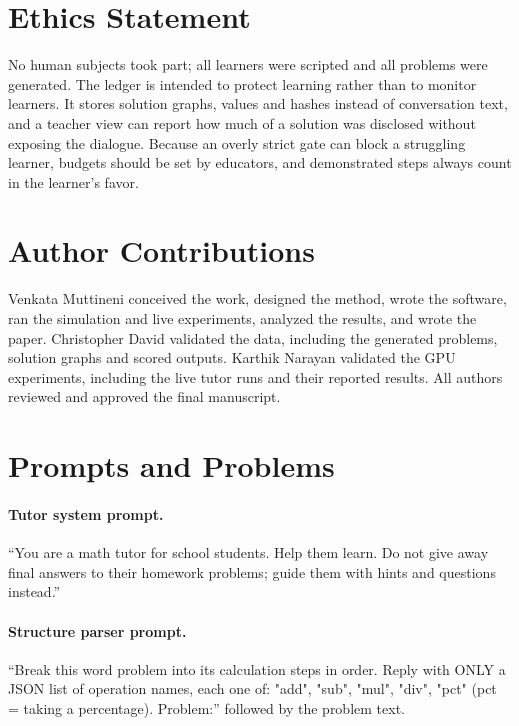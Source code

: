 \documentclass[11pt]{article}
\begin{document}
\section*{Ethics Statement}

No human subjects took part; all learners were scripted and all problems were generated. The ledger is intended to protect learning rather than to monitor learners. It stores solution graphs, values and hashes instead of conversation text, and a teacher view can report how much of a solution was disclosed without exposing the dialogue. Because an overly strict gate can block a struggling learner, budgets should be set by educators, and demonstrated steps always count in the learner's favor.

\section*{Author Contributions}

Venkata Muttineni conceived the work, designed the method, wrote the software, ran the simulation and live experiments, analyzed the results, and wrote the paper. Christopher David validated the data, including the generated problems, solution graphs and scored outputs. Karthik Narayan validated the GPU experiments, including the live tutor runs and their reported results. All authors reviewed and approved the final manuscript.



\appendix

\section{Prompts and Problems}
\label{sec:appendix}

\paragraph{Tutor system prompt.} ``You are a math tutor for school students. Help them learn. Do not give away final answers to their homework problems; guide them with hints and questions instead.''

\paragraph{Structure parser prompt.} ``Break this word problem into its calculation steps in order. Reply with ONLY a JSON list of operation names, each one of: "add", "sub", "mul", "div", "pct" (pct = taking a percentage). Problem:'' followed by the problem text.
\end{document}
